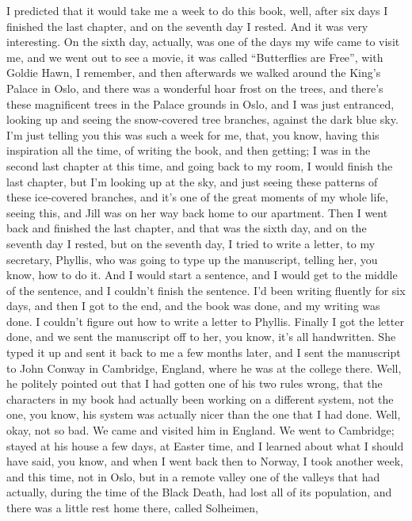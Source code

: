 \documentclass[]{article}
\begin{document}
I predicted that it would take me a week to do this book, well, after
six days I finished the last chapter, and on the seventh day I rested.
And it was very interesting. On the sixth day, actually, was one of the
days my wife came to visit me, and we went out to see a movie, it was
called ``Butterflies are Free'', with Goldie Hawn, I remember, and then
afterwards we walked around the King's Palace in Oslo, and there was a
wonderful hoar frost on the trees, and there's these magnificent trees
in the Palace grounds in Oslo, and I was just entranced, looking up and
seeing the snow-covered tree branches, against the dark blue sky. I'm
just telling you this was such a week for me, that, you know, having
this inspiration all the time, of writing the book, and then getting; I
was in the second last chapter at this time, and going back to my room,
I would finish the last chapter, but I'm looking up at the sky, and just
seeing these patterns of these ice-covered branches, and it's one of the
great moments of my whole life, seeing this, and Jill was on her way
back home to our apartment. Then I went back and finished the last
chapter, and that was the sixth day, and on the seventh day I rested,
but on the seventh day, I tried to write a letter, to my secretary,
Phyllis, who was going to type up the manuscript, telling her, you know,
how to do it. And I would start a sentence, and I would get to the
middle of the sentence, and I couldn't finish the sentence. I'd been
writing fluently for six days, and then I got to the end, and the book
was done, and my writing was done. I couldn't figure out how to write a
letter to Phyllis. Finally I got the letter done, and we sent the
manuscript off to her, you know, it's all handwritten. She typed it up
and sent it back to me a few months later, and I sent the manuscript to
John Conway in Cambridge, England, where he was at the college there.
Well, he politely pointed out that I had gotten one of his two rules
wrong, that the characters in my book had actually been working on a
different system, not the one, you know, his system was actually nicer
than the one that I had done. Well, okay, not so bad. We came and
visited him in England. We went to Cambridge; stayed at his house a few
days, at Easter time, and I learned about what I should have said, you
know, and when I went back then to Norway, I took another week, and this
time, not in Oslo, but in a remote valley one of the valleys that had
actually, during the time of the Black Death, had lost all of its
population, and there was a little rest home there, called Solheimen,
\end{document}
